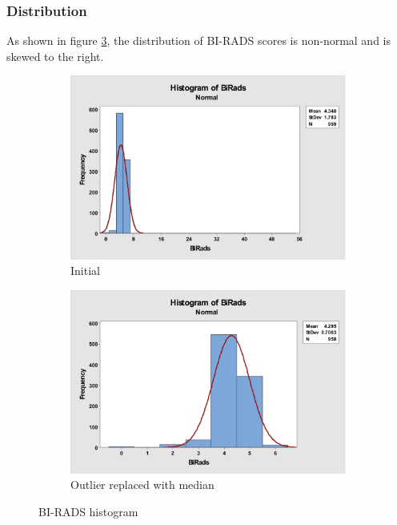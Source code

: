 \documentclass[12pt]{article}
\begin{document}
      \subsubsection{Distribution}
        As shown in figure \ref{fig:birads-both-histogram}, the distribution of BI-RADS scores is non-normal and is skewed to the right.

        \begin{figure}[H]
          \begin{subfigure}[b]{0.45\textwidth}
            \includegraphics[width=\textwidth]{birads-histogram}
            \caption{Initial}
            \label{fig:birads-histogram}
          \end{subfigure}
          \hfill
          \begin{subfigure}[b]{0.45\textwidth}
            \includegraphics[width=\textwidth]{birads-histogram-no55}
            \caption{Outlier replaced with median}
            \label{fig:birads-histogram-no55}
          \end{subfigure}
          \caption{BI-RADS histogram}
          \label{fig:birads-both-histogram}
        \end{figure}
\end{document}
